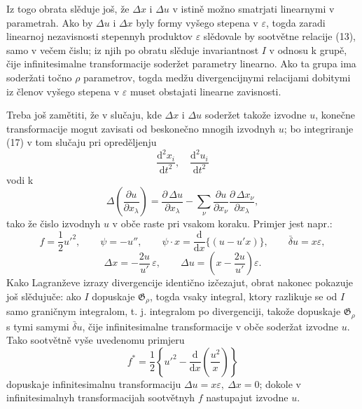\documentclass[11pt]{article}
\providecommand{\G}{\mathfrak G}
\providecommand{\eps}{\varepsilon}
\providecommand{\D}{\Delta}
\providecommand{\p}{\partial}
\providecommand{\dd}{\mathrm d}
\providecommand{\bd}{\bar{\delta}}
\begin{document}
Iz togo obrata slěduje još, že \(\D x\) i \(\D u\) v istině možno smatrjati linearnymi v parametrah. Ako by \(\D u\) i \(\D x\) byly formy vyšego stepena v \(\eps\), togda zaradi linearnoj nezavisnosti stepennyh produktov \(\eps\) slědovale by sootvětne relacije (13), samo v večem čislu; iz njih po obratu slěduje invariantnost \(I\) v odnosu k grupě, čije infinitesimalne transformacije soderžet parametry linearno. Ako ta grupa ima soderžati točno \(\rho\) parametrov, togda medžu divergencijnymi relacijami dobitymi iz členov vyšego stepena v \(\eps\) muset obstajati linearne zavisnosti.

Treba još zamětiti, že v slučaju, kde \(\D x\) i \(\D u\) soderžet takože izvodne \(u\), konečne transformacije mogut zavisati od beskonečno mnogih izvodnyh \(u\); bo integriranje (17) v tom slučaju pri opreděljenju
\[
\frac{\dd^2x_i}{\dd t^2},\quad \frac{\dd^2u_i}{\dd t^2}
\]
vodi k
\[
\D\!\left(\frac{\p u}{\p x_\lambda}\right)
=\frac{\p\,\D u}{\p x_\lambda}
-\sum_\nu\frac{\p u}{\p x_\nu}
\frac{\p\,\D x_\nu}{\p x_\lambda},
\]
tako že čislo izvodnyh \(u\) v obče raste pri vsakom koraku. Primjer jest napr.:
\[
f=\frac12 u'^2,\qquad
\psi=-u'',\qquad
\psi\cdot x=\frac{\dd}{\dd x}\{(u-u'x)\},\qquad
\bd u=x\eps,
\]
\[
\D x=-\frac{2u}{u'}\,\eps,\qquad
\D u=\left(x-\frac{2u}{u'}\right)\eps.
\]
Kako Lagranževe izrazy divergencije identično izčezajut, obrat nakonec pokazuje još slědujuče: ako \(I\) dopuskaje \(\G_\rho\), togda vsaky integral, ktory razlikuje se od \(I\) samo graničnym integralom, t. j. integralom po divergenciji, takože dopuskaje \(\G_\rho\) s tymi samymi \(\bd u\), čije infinitesimalne transformacije v obče soderžat izvodne \(u\). Tako sootvětně vyše uvedenomu primjeru
\[
f^*=\frac12\left\{u'^2-\frac{\dd}{\dd x}\left(\frac{u^2}{x}\right)\right\}
\]
dopuskaje infinitesimalnu transformaciju \(\D u=x\eps,\ \D x=0\); dokole v infinitesimalnyh transformacijah sootvětnyh \(f\) nastupajut izvodne \(u\).
\end{document}
